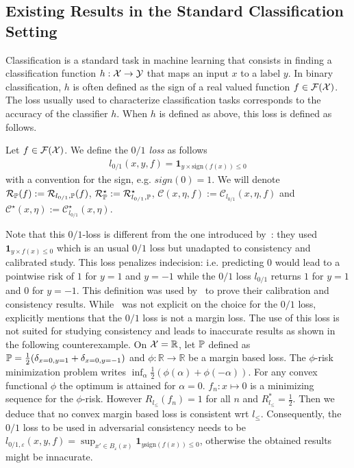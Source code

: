 \subsection{Existing Results in the Standard Classification Setting}

Classification is a standard task in machine learning that consists in finding a classification function $h:\mathcal{X}\to\mathcal{Y}$ that maps an input $x$ to a label $y$. In binary classification, $h$ is often defined as the sign of a real valued function $f \in \mathcal{F}(\mathcal{X})$. The loss usually used to characterize classification tasks corresponds to the accuracy of the classifier $h$. When $h$ is defined as above, this loss is defined as follows.




\begin{definition}[$0/1$ loss]
Let $f \in \mathcal{F}(\mathcal{X})$. We define the \emph{$0/1$ loss} as follows
\begin{align*}
     l_{0/1}(x,y,f)=\mathbf{1}_{y\times\text{sign}(f(x))\leq 0}
\end{align*}
 with a convention for the sign, e.g. $sign(0) = 1$.  We will denote $\mathcal{R}_{\mathbb{P}}(f) :=\mathcal{R}_{l_{0/1},\mathbb{P}}(f)$,  $\mathcal{R}_{\mathbb{P}}^\star :=\mathcal{R}_{l_{0/1},\mathbb{P}}^\star$, $\mathcal{C}(x,\eta,f):= \mathcal{C}_{l_{0/1}}(x,\eta,f)$ and $\mathcal{C}^\star(x,\eta):= \mathcal{C}^\star_{l_{0/1}}(x,\eta)$.
\end{definition}

Note that this $0/1$-loss is different from the one introduced by~\citet{bao2020calibrated,awasthi2021calibration,awasthi2021finer}: they used $\mathbf{1}_{y\times f(x)\leq 0}$ which is an usual $0/1$ loss but unadapted to consistency and calibrated study. This loss penalizes indecision: i.e. predicting $0$ would lead to a pointwise risk of $1$ for $y=1$ and $y=-1$ while the $0/1$ loss $l_{0/1}$ returns $1$ for $y=1$ and $0$ for $y=-1$. This definition was used by~\citet{bao2020calibrated,awasthi2021calibration,awasthi2021finer} to prove their calibration and consistency results. While~\citet{bartlett2006convexity} was not explicit on the choice for the $0/1$ loss,~\citet{steinwart2007compare} explicitly mentions that the $0/1$ loss is not a margin loss. The use of this loss is not suited for studying consistency and leads to inaccurate results as shown in the following counterexample. On $\mathcal{X}= \mathbb{R}$, let $\mathbb{P}$ defined as 
$\PP = \frac12\left(\delta_{x=0,y=1}+\delta_{x=0,y=-1}\right)$ and $\phi:\mathbb{R}\to\mathbb{R}$ be a margin based loss. The $\phi$-risk minimization problem writes $\inf_{\alpha} \frac{1}{2} (\phi(\alpha)+\phi(-\alpha))$. For any convex functional $\phi$ the optimum is attained for $\alpha=0$. $f_n:x\mapsto 0$ is a minimizing sequence for the $\phi$-risk. However $R_{l_{\leq}}(f_n)=1$ for all $n$ and $R_{l_{\leq}}^*=\frac{1}{2}$. Then we deduce that no convex margin based loss is consistent wrt $l_{\leq}$. Consequently, the $0/1$ loss to be used in adversarial consistency needs to be $l_{0/1,\varepsilon}(x,y,f) = \sup_{x'\in B_\varepsilon(x)} \mathbf{1}_{y\text{sign}(f(x))\leq 0}$, otherwise the obtained results might be innacurate.



